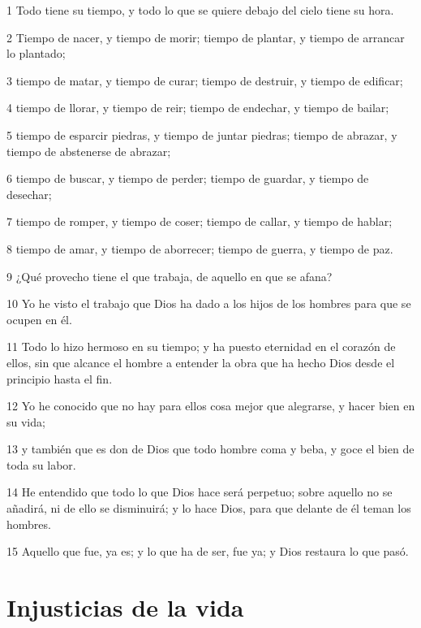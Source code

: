 \par 1 Todo tiene su tiempo, y todo lo que se quiere debajo del cielo tiene su hora.
\par 2 Tiempo de nacer, y tiempo de morir; tiempo de plantar, y tiempo de arrancar lo plantado;
\par 3 tiempo de matar, y tiempo de curar; tiempo de destruir, y tiempo de edificar;
\par 4 tiempo de llorar, y tiempo de reir; tiempo de endechar, y tiempo de bailar;
\par 5 tiempo de esparcir piedras, y tiempo de juntar piedras; tiempo de abrazar, y tiempo de abstenerse de abrazar;
\par 6 tiempo de buscar, y tiempo de perder; tiempo de guardar, y tiempo de desechar;
\par 7 tiempo de romper, y tiempo de coser; tiempo de callar, y tiempo de hablar;
\par 8 tiempo de amar, y tiempo de aborrecer; tiempo de guerra, y tiempo de paz.
\par 9 ¿Qué provecho tiene el que trabaja, de aquello en que se afana?
\par 10 Yo he visto el trabajo que Dios ha dado a los hijos de los hombres para que se ocupen en él.
\par 11 Todo lo hizo hermoso en su tiempo; y ha puesto eternidad en el corazón de ellos, sin que alcance el hombre a entender la obra que ha hecho Dios desde el principio hasta el fin.
\par 12 Yo he conocido que no hay para ellos cosa mejor que alegrarse, y hacer bien en su vida;
\par 13 y también que es don de Dios que todo hombre coma y beba, y goce el bien de toda su labor.
\par 14 He entendido que todo lo que Dios hace será perpetuo; sobre aquello no se añadirá, ni de ello se disminuirá; y lo hace Dios, para que delante de él teman los hombres.
\par 15 Aquello que fue, ya es; y lo que ha de ser, fue ya; y Dios restaura lo que pasó.

\section*{Injusticias de la vida}

